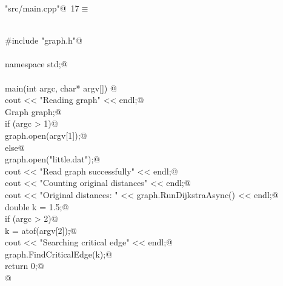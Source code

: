 \documentclass[12pt]{article}
\begin{document}
\begin{flushleft} \small
\begin{minipage}{\linewidth}\label{scrap22}\raggedright\small
{} \verb@"src/main.cpp"@\nobreak\ {\footnotesize {17}}$\equiv$
\vspace{-1ex}
\begin{list}{}{} \item
\mbox{}\verb@@\\
\mbox{}\verb@#include "graph.h"@\\
\mbox{}\verb@@\\
\mbox{}\verb@using namespace std;@\\
\mbox{}\verb@@\\
\mbox{}\verb@int main(int argc, char* argv[]) {@\\
\mbox{}\verb@    cout << "Reading graph" << endl;@\\
\mbox{}\verb@    Graph graph;@\\
\mbox{}\verb@    if (argc > 1)@\\
\mbox{}\verb@        graph.open(argv[1]);@\\
\mbox{}\verb@    else@\\
\mbox{}\verb@        graph.open("little.dat");@\\
\mbox{}\verb@    cout << "Read graph successfully" << endl;@\\
\mbox{}\verb@    cout << "Counting original distances" << endl;@\\
\mbox{}\verb@    cout << "Original distances: " << graph.RunDijkstraAsync() << endl;@\\
\mbox{}\verb@    double k = 1.5;@\\
\mbox{}\verb@    if (argc > 2)@\\
\mbox{}\verb@        k = atof(argv[2]);@\\
\mbox{}\verb@    cout << "Searching critical edge" << endl;@\\
\mbox{}\verb@    graph.FindCriticalEdge(k);@\\
\mbox{}\verb@    return 0;@\\
\mbox{}\verb@}@\\
\mbox{}\verb@@{\NWsep}
\end{list}
\vspace{-1.5ex}
\footnotesize
\begin{list}{}{\setlength{\itemsep}{-\parsep}\setlength{\itemindent}{-\leftmargin}}

\item{}
\end{list}
\end{minipage}\vspace{4ex}
\end{flushleft}
\end{document}
